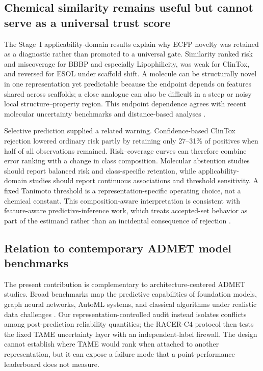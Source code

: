 \subsection{Chemical similarity remains useful but cannot serve as a universal trust score}

The Stage~I applicability-domain results explain why ECFP novelty was retained as a diagnostic rather than promoted to a universal gate. Similarity ranked risk and miscoverage for BBBP and especially Lipophilicity, was weak for ClinTox, and reversed for ESOL under scaffold shift. A molecule can be structurally novel in one representation yet predictable because the endpoint depends on features shared across scaffolds; a close analogue can also be difficult in a steep or noisy local structure--property region. This endpoint dependence agrees with recent molecular uncertainty benchmarks and distance-based analyses \citep{lanini2024unique,kim2025distance,koetter2025upgrading,parrondo2026shifts}.

Selective prediction supplied a related warning. Confidence-based ClinTox rejection lowered ordinary risk partly by retaining only 27--31\% of positives when half of all observations remained. Risk--coverage curves can therefore combine error ranking with a change in class composition. Molecular abstention studies should report balanced risk and class-specific retention, while applicability-domain studies should report continuous associations and threshold sensitivity. A fixed Tanimoto threshold is a representation-specific operating choice, not a chemical constant.
This composition-aware interpretation is consistent with feature-aware predictive-inference work, which treats accepted-set behavior as part of the estimand rather than an incidental consequence of rejection \citep{teng2023feature}.

\subsection{Relation to contemporary ADMET model benchmarks}

The present contribution is complementary to architecture-centered ADMET studies. Broad benchmarks map the predictive capabilities of foundation models, graph neural networks, AutoML systems, and classical algorithms under realistic data challenges \citep{zhao2026revisiting}. Our representation-controlled audit instead isolates conflicts among post-prediction reliability quantities; the RACER-C4 protocol then tests the fixed TAME uncertainty layer with an independent-label firewall. The design cannot establish where TAME would rank when attached to another representation, but it can expose a failure mode that a point-performance leaderboard does not measure.

